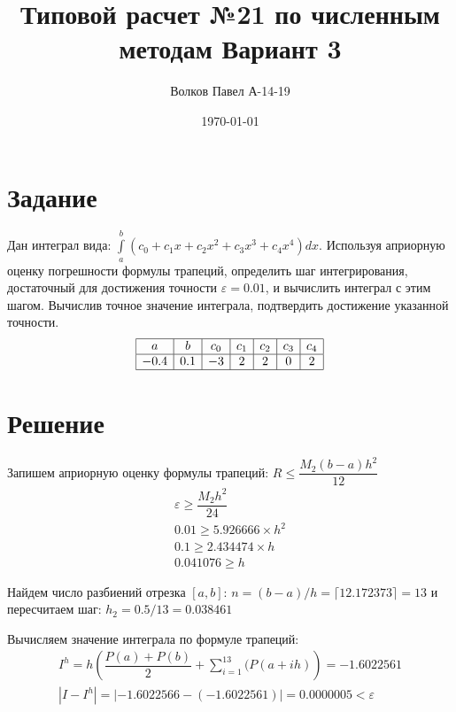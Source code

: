 \documentclass[a4paper,12pt]{report} %
\author{Волков Павел А-14-19}
\title{Типовой расчет №21 по численным методам Вариант 3}
\date{\today}
\begin{document}

\maketitle

\newpage
\section*{Задание}
Дан интеграл вида: $\int\limits_a^b(c_0 + c_1x + c_2x^2 + c_3x^3 + c_4x^4)dx$. Используя априорную оценку погрешности формулы трапеций, определить шаг интегрирования, достаточный для достижения точности $\varepsilon = 0.01$, и вычислить интеграл с этим шагом. Вычислив точное значение интеграла, подтвердить достижение указанной точности.
\[
\begin{array}{ | c | c | c | c | c | c | c | }
	\hline
	    a  &   b  & c_0 & c_1 & c_2 & c_3 & c_4  \\ \hline
	 -0.4 & 0.1 &  -3  &   2  &   2  &   0   &    2  \\ \hline
\end{array}
\]
\section*{Решение}
Запишем априорную оценку формулы трапеций: $R \leq \dfrac{M_2(b-a)h^2}{12}$
\begin{gather*}
	\varepsilon \geq \dfrac{M_2h^2}{24} \\
	0.01 \geq 5.926666 \times h^2 \\
	0.1 \geq 2.434474 \times h \\
	0.041076 \geq h
\end{gather*}

Найдем число разбиений отрезка $[a, b]$: $n = (b-a) / h =\lceil12.172373\rceil = 13 $ и пересчитаем шаг: $h_2 = 0.5 / 13 = 0.038461$

Вычисляем значение интеграла по формуле трапеций:
\begin{gather*}
	I^h = h\left(\dfrac{P(a) + P(b)}{2} + \sum\limits_{i=1}^{13}(P(a + ih)\right) = -1.6022561 \\
	|I - I^h| = |-1.6022566 - (-1.6022561)| = 0.0000005 < \varepsilon
\end{gather*}
\end{document}
